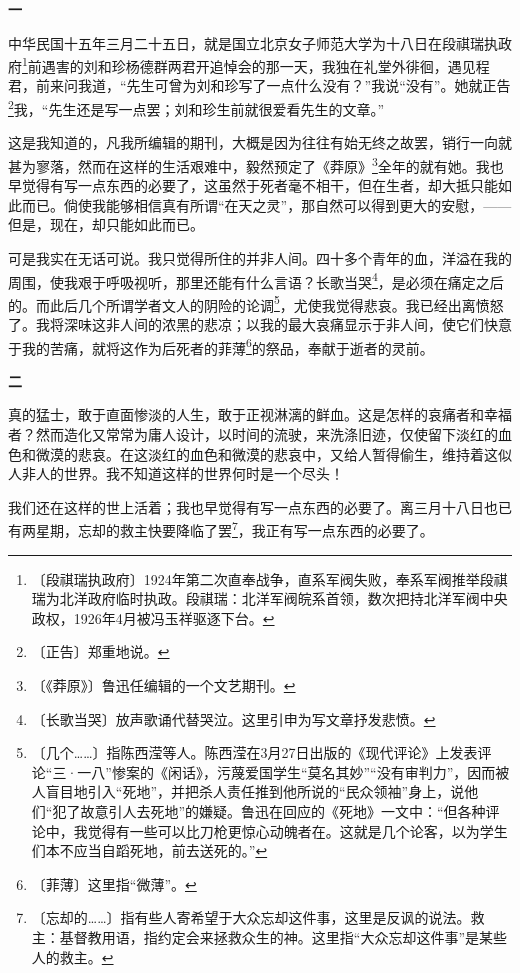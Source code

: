 \documentclass[12pt,UTF-8,openany]{ctexbook}
\begin{document}
\begin{normalsize}
    
    \begin{center}\textbf{一}\end{center}
    
    中华民国十五年三月二十五日，就是国立北京女子师范大学为十八日在段祺瑞执政府\footnote{〔段祺瑞执政府〕1924年第二次直奉战争，直系军阀失败，奉系军阀推举段祺瑞为北洋政府临时执政。段祺瑞：北洋军阀皖系首领，数次把持北洋军阀中央政权，1926年4月被冯玉祥驱逐下台。}前遇害的刘和珍杨德群两君开追悼会的那一天，我独在礼堂外徘徊，遇见程君，前来问我道，“先生可曾为刘和珍写了一点什么没有？”我说“没有”。她就正告\footnote{〔正告〕郑重地说。}我，“先生还是写一点罢；刘和珍生前就很爱看先生的文章。”
    
    这是我知道的，凡我所编辑的期刊，大概是因为往往有始无终之故罢，销行一向就甚为寥落，然而在这样的生活艰难中，毅然预定了《莽原》\footnote{〔《莽原》〕鲁迅任编辑的一个文艺期刊。}全年的就有她。我也早觉得有写一点东西的必要了，这虽然于死者毫不相干，但在生者，却大抵只能如此而已。倘使我能够相信真有所谓“在天之灵”，那自然可以得到更大的安慰，——但是，现在，却只能如此而已。
    
    可是我实在无话可说。我只觉得所住的并非人间。四十多个青年的血，洋溢在我的周围，使我艰于呼吸视听，那里还能有什么言语？长歌当哭\footnote{〔长歌当哭〕放声歌诵代替哭泣。这里引申为写文章抒发悲愤。}，是必须在痛定之后的。而此后几个所谓学者文人的阴险的论调\footnote{〔几个……〕指陈西滢等人。陈西滢在3月27日出版的《现代评论》上发表评论“三·一八”惨案的《闲话》，污蔑爱国学生“莫名其妙”“没有审判力”，因而被人盲目地引入“死地”，并把杀人责任推到他所说的“民众领袖”身上，说他们“犯了故意引人去死地”的嫌疑。鲁迅在回应的《死地》一文中：“但各种评论中，我觉得有一些可以比刀枪更惊心动魄者在。这就是几个论客，以为学生们本不应当自蹈死地，前去送死的。”}，尤使我觉得悲哀。我已经出离愤怒了。我将深味这非人间的浓黑的悲凉；以我的最大哀痛显示于非人间，使它们快意于我的苦痛，就将这作为后死者的菲薄\footnote{〔菲薄〕这里指“微薄”。}的祭品，奉献于逝者的灵前。
    
    \begin{center}\textbf{二}\end{center}
    
    真的猛士，敢于直面惨淡的人生，敢于正视淋漓的鲜血。这是怎样的哀痛者和幸福者？然而造化又常常为庸人设计，以时间的流驶，来洗涤旧迹，仅使留下淡红的血色和微漠的悲哀。在这淡红的血色和微漠的悲哀中，又给人暂得偷生，维持着这似人非人的世界。我不知道这样的世界何时是一个尽头！
    
    我们还在这样的世上活着；我也早觉得有写一点东西的必要了。离三月十八日也已有两星期，忘却的救主快要降临了罢\footnote{〔忘却的……〕指有些人寄希望于大众忘却这件事，这里是反讽的说法。救主：基督教用语，指约定会来拯救众生的神。这里指“大众忘却这件事”是某些人的救主。}，我正有写一点东西的必要了。
    

\end{normalsize}
\end{document}

